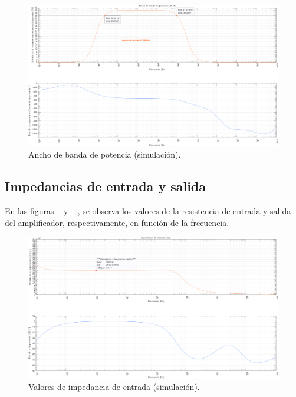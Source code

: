 \begin{figure}[H]
    \centering
    \includegraphics[height=0.66 \textwidth, angle=90]{./img/simulaciones/BW/Power_BW.png}
    \caption{Ancho de banda de potencia (simulación).}
    \label{fig:Power_BW_sim}
\end{figure}

\clearpage

\subsection{Impedancias de entrada y salida}

\par En las figuras ~ y ~ , se observa los valores de la resistencia de entrada y salida del amplificador, respectivamente, en función de la frecuencia.

\vfill

\clearpage

\begin{figure}[H]
    \centering
    \includegraphics[height=0.66 \textwidth, angle=90]{./img/simulaciones/Impedance/amplifier_Zi.png}
    \caption{Valores de impedancia de entrada (simulación).}
    \label{fig:amplifier_Zi_sim}
\end{figure}


